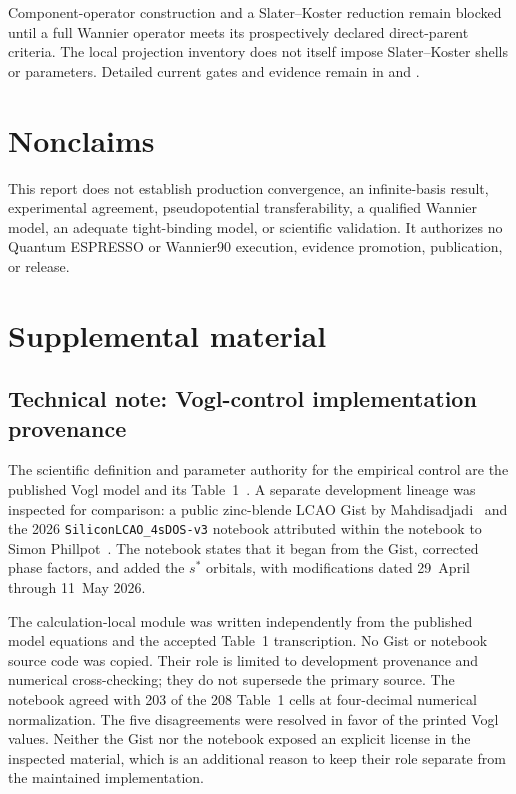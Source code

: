 \documentclass[11pt]{article}
\begin{document}
Component-operator construction and a Slater--Koster reduction remain
blocked until a full Wannier operator meets its
prospectively declared direct-parent criteria.  The local projection inventory does not
itself impose Slater--Koster shells or parameters.  Detailed current gates and evidence
remain in  and
.

\section{Nonclaims}

This report does not establish production convergence, an infinite-basis result,
experimental agreement, pseudopotential transferability, a qualified Wannier model,
an adequate tight-binding model, or scientific validation.  It authorizes no Quantum
ESPRESSO or Wannier90 execution, evidence promotion, publication, or release.

\appendix
\section{Supplemental material}

\subsection{Technical note: Vogl-control implementation provenance}

The scientific definition and parameter authority for the empirical control are the
published Vogl model and its Table~1~\cite{Vogl1983}.  A separate development lineage
was inspected for comparison: a public zinc-blende LCAO Gist by
Mahdisadjadi~\cite{MahdisadjadiGist} and the 2026
\texttt{SiliconLCAO\_4sDOS-v3} notebook attributed within the notebook to Simon
Phillpot~\cite{Phillpot2026}.  The notebook states that it began from the Gist, corrected
phase factors, and added the $s^*$ orbitals, with modifications dated 29~April through
11~May 2026.

The calculation-local module
 was written independently from the published
model equations and the accepted Table~1 transcription.  No Gist or notebook source code
was copied.  Their role is limited to development provenance and numerical cross-checking;
they do not supersede the primary source.  The notebook agreed with 203 of the 208 Table~1
cells at four-decimal numerical normalization.  The five disagreements were resolved in
favor of the printed Vogl values.  Neither the Gist nor the notebook exposed an explicit
license in the inspected material, which is an additional reason to keep their role
separate from the maintained implementation.
\end{document}
